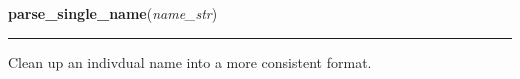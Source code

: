     \vspace{0.5ex}

\hspace{.8\funcindent}\begin{boxedminipage}{\funcwidth}

    \raggedright \textbf{parse\_single\_name}(\textit{name\_str})

    \vspace{-1.5ex}

    \rule{\textwidth}{0.5\fboxrule}
\setlength{\parskip}{2ex}

Clean up an indivdual name into a more consistent format.
\setlength{\parskip}{1ex}
    \end{boxedminipage}

    \label{biblio:webquery:utils:parse_names}

    \vspace{0.5ex}

